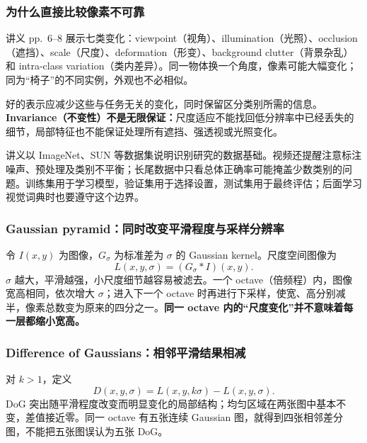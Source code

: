 \subsubsection*{为什么直接比较像素不可靠}

讲义 pp.~6--8 展示七类变化：viewpoint（视角）、illumination（光照）、occlusion（遮挡）、scale（尺度）、deformation（形变）、background clutter（背景杂乱）和 intra-class variation（类内差异）。同一物体换一个角度，像素可能大幅变化；同为“椅子”的不同实例，外观也不必相似。

好的表示应减少这些与任务无关的变化，同时保留区分类别所需的信息。\textbf{Invariance（不变性）不是无限保证：}尺度适应不能找回低分辨率中已经丢失的细节，局部特征也不能保证处理所有遮挡、强透视或光照变化。

讲义以 ImageNet、SUN 等数据集说明识别研究的数据基础。视频还提醒注意标注噪声、预处理及类别不平衡；长尾数据中只看总体正确率可能掩盖少数类别的问题。训练集用于学习模型，验证集用于选择设置，测试集用于最终评估；后面学习视觉词典时也要遵守这个边界。



\subsubsection*{Gaussian pyramid：同时改变平滑程度与采样分辨率}

令 $I(x,y)$ 为图像，$G_\sigma$ 为标准差为 $\sigma$ 的 Gaussian kernel。尺度空间图像为
\[
  L(x,y,\sigma)=(G_\sigma*I)(x,y).
\]
$\sigma$ 越大，平滑越强，小尺度细节越容易被滤去。一个 octave（倍频程）内，图像宽高相同，依次增大 $\sigma$；进入下一个 octave 时再进行下采样，使宽、高分别减半，像素总数变为原来的四分之一。\textbf{同一 octave 内的“尺度变化”并不意味着每一层都缩小宽高。}

\subsubsection*{Difference of Gaussians：相邻平滑结果相减}

对 $k>1$，定义
\[
  \boxed{D(x,y,\sigma)=L(x,y,k\sigma)-L(x,y,\sigma)}.
\]
DoG 突出随平滑程度改变而明显变化的局部结构；均匀区域在两张图中基本不变，差值接近零。同一 octave 有五张连续 Gaussian 图，就得到四张相邻差分图，不能把五张图误认为五张 DoG。

